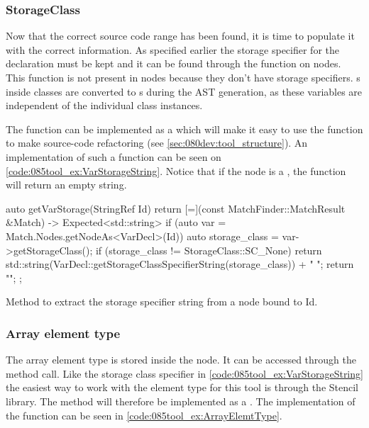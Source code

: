 \subsubsection*{StorageClass}
Now that the correct source code range has been found, it is time to populate it with the correct information. As specified earlier the storage specifier for the declaration must be kept and it can be found through the  function on  nodes. This function is not present in  nodes because they don't have storage specifiers.  s inside classes are converted to s during the AST generation, as these variables are independent of the individual class instances. 

The  function can be implemented as a  which will make it easy to use the function to make source-code refactoring (see \cref{sec:080dev:tool_structure}). An implementation of such a function can be seen on \cref{code:085tool_ex:VarStorageString}.
Notice that if the node is a , the function will return an empty string.

\begin{listing}[H]
    \begin{cppcode}
auto getVarStorage(StringRef Id) {
    return [=](const MatchFinder::MatchResult &Match) -> Expected<std::string> {
        if (auto var = Match.Nodes.getNodeAs<VarDecl>(Id)) {
            auto storage_class = var->getStorageClass();
            if (storage_class != StorageClass::SC_None) {
               return std::string(VarDecl::getStorageClassSpecifierString(storage_class)) + " ";
            }
        }
        return "";
    };
}
    \end{cppcode}
    \caption{Method to extract the storage specifier string from a  node bound to Id.}
    \label{code:085tool_ex:VarStorageString}
\end{listing}

\subsubsection*{Array element type}

The array element type is stored inside the  node. It can be accessed through the  method call. Like the storage class specifier in \cref{code:085tool_ex:VarStorageString} the easiest way to work with the element type for this tool is through the Stencil library. The  method will therefore be implemented as a . The implementation of the function can be seen in \cref{code:085tool_ex:ArrayElemtType}. 

